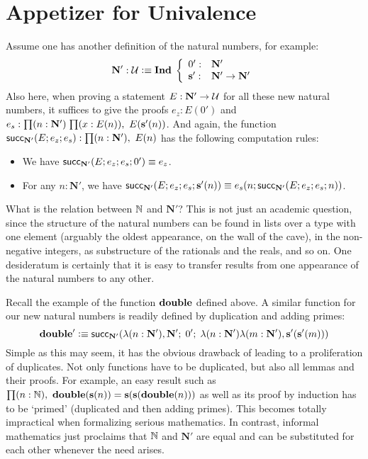 
\section{Appetizer for Univalence}

\newcommand{\natp}{\ensuremath{\mathbf{N'}}\xspace}
\newcommand{\zp}{\ensuremath{0'}\xspace}
\newcommand{\Sp}{\ensuremath{\mathbf{s'}}\xspace}
\newcommand{\dblp}{\ensuremath{\mathbf{double'}}}

Assume one has another definition of the natural numbers, for example:
\[  \natp : \type \defeq \ind \left\{
\begin{array}{ll}
\zp : & \natp \\
\Sp : & \natp \to \natp
\end{array}
\right. \]
Also here, when proving a statement $E : \natp \to \type$ for all these new natural numbers, it suffices to give the proofs $e_z : E(\zp)$ and $e_s : \prd{n : \natp}{x : E(n)} E(\Sp(n))$. And again, the function $\rec_\natp(E;e_z;e_s) : \prd{n:\natp} E(n)$
has the following computation rules:
\begin{itemize}
\item We have $\rec_\natp(E;e_z;e_s;\zp) \equiv e_z$.
\item For any $n : \natp$, we have $\rec_\natp(E;e_z;e_s;\Sp(n)) \equiv e_s(n;\rec_\natp(E;e_z;e_s;n))$.
\end{itemize}
What is the relation between $\mathbb{N}$ and $\natp$?
This is not just an academic question, since the structure of the natural numbers
can be found in lists over a type with one element (arguably the oldest appearance,
on the wall of the cave), in the non-negative integers, as substructure of the
rationals and the reals, and so on. One desideratum is certainly that it is easy to
transfer results from one appearance of the natural numbers to any other.

Recall the example of the function $\mathbf{double}$ defined above. A similar function
for our new natural numbers is readily defined by duplication and adding primes:
\[ \dblp \defeq \rec_\natp(\lambda(n :\natp), \natp; \; \zp; \;  \lambda(n: \natp) \lambda (m:\natp), \Sp(\Sp(m))) \]
Simple as this may seem, it has the obvious drawback of leading to a
proliferation of duplicates. Not only functions have to be
duplicated, but also all lemmas and their proofs. For example,
an easy result such as  $\prd{n : \nat} \dbl(\s(n))=\s(\s(\dbl(n)))$ as well
as its proof by induction has to be `primed' (duplicated and then adding primes).
This becomes totally impractical when formalizing serious mathematics.
In contrast, informal mathematics just proclaims that $\mathbb{N}$ and $\natp$ are
equal and can be substituted for each other whenever the need arises.

